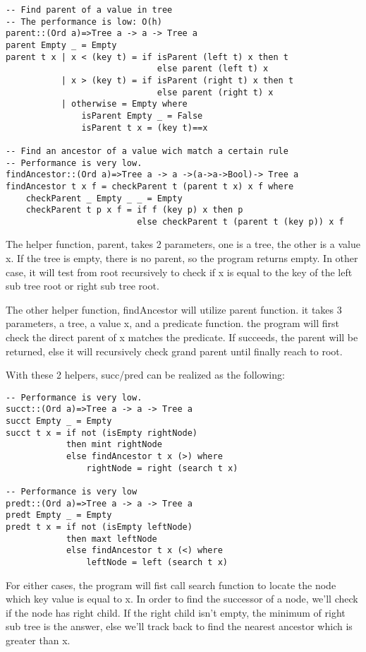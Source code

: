 \documentclass{article}
\begin{document}
\lstset{language=Haskell}
\begin{lstlisting}
-- Find parent of a value in tree
-- The performance is low: O(h)
parent::(Ord a)=>Tree a -> a -> Tree a
parent Empty _ = Empty
parent t x | x < (key t) = if isParent (left t) x then t 
                              else parent (left t) x
           | x > (key t) = if isParent (right t) x then t 
                              else parent (right t) x
           | otherwise = Empty where
               isParent Empty _ = False
               isParent t x = (key t)==x

-- Find an ancestor of a value wich match a certain rule
-- Performance is very low.
findAncestor::(Ord a)=>Tree a -> a ->(a->a->Bool)-> Tree a
findAncestor t x f = checkParent t (parent t x) x f where
    checkParent _ Empty _ _ = Empty
    checkParent t p x f = if f (key p) x then p
                          else checkParent t (parent t (key p)) x f
\end{lstlisting}

The helper function, parent, takes 2 parameters, one is a tree, the other
is a value x. If the tree is empty, there is no parent, so the program returns
empty. In other case, it will test from root recursively to check if x is equal to
the key of the left sub tree root or right sub tree root.

The other helper function, findAncestor will utilize parent function. it takes 3
parameters, a tree, a value x, and a predicate function. the program will first 
check the direct parent of x matches the predicate. If succeeds, the parent will
be returned, else it will recursively check grand parent until finally reach to root.

With these 2 helpers, succ/pred can be realized as the following:
\begin{lstlisting}
-- Performance is very low.
succt::(Ord a)=>Tree a -> a -> Tree a
succt Empty _ = Empty
succt t x = if not (isEmpty rightNode)
            then mint rightNode
            else findAncestor t x (>) where
                rightNode = right (search t x)

-- Performance is very low
predt::(Ord a)=>Tree a -> a -> Tree a
predt Empty _ = Empty
predt t x = if not (isEmpty leftNode)
            then maxt leftNode
            else findAncestor t x (<) where
                leftNode = left (search t x)
\end{lstlisting}

For either cases, the program will fist call search function to locate the node
which key value is equal to x. In order to find the successor of a node, we'll 
check if the node has right child. If the right child isn't empty, the minimum 
of right sub tree is the answer, else we'll track back to find the nearest 
ancestor which is greater than x.
\end{document}

